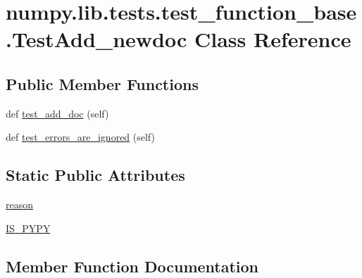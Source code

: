 \hypertarget{classnumpy_1_1lib_1_1tests_1_1test__function__base_1_1TestAdd__newdoc}{}\section{numpy.\+lib.\+tests.\+test\+\_\+function\+\_\+base.\+Test\+Add\+\_\+newdoc Class Reference}
\label{classnumpy_1_1lib_1_1tests_1_1test__function__base_1_1TestAdd__newdoc}
\subsection*{Public Member Functions}
\begin{DoxyCompactItemize}
\item 
def \hyperlink{classnumpy_1_1lib_1_1tests_1_1test__function__base_1_1TestAdd__newdoc_a6053e39ddbbfd9d6cc52f3e8b3cdd85d}{test\+\_\+add\+\_\+doc} (self)
\item 
def \hyperlink{classnumpy_1_1lib_1_1tests_1_1test__function__base_1_1TestAdd__newdoc_a6b7e8c1abb5288496ede4d2e3a52e0f1}{test\+\_\+errors\+\_\+are\+\_\+ignored} (self)
\end{DoxyCompactItemize}
\subsection*{Static Public Attributes}
\begin{DoxyCompactItemize}
\item 
\hyperlink{classnumpy_1_1lib_1_1tests_1_1test__function__base_1_1TestAdd__newdoc_a7e33f2eb0bbc5631cd4bad4cf4866a34}{reason}
\item 
\hyperlink{classnumpy_1_1lib_1_1tests_1_1test__function__base_1_1TestAdd__newdoc_a6ca213b55c2597270a04815e64da6a2e}{I\+S\+\_\+\+P\+Y\+PY}
\end{DoxyCompactItemize}


\subsection{Member Function Documentation}
\mbox{\label{classnumpy_1_1lib_1_1tests_1_1test__function__base_1_1TestAdd__newdoc_a6053e39ddbbfd9d6cc52f3e8b3cdd85d}} 
